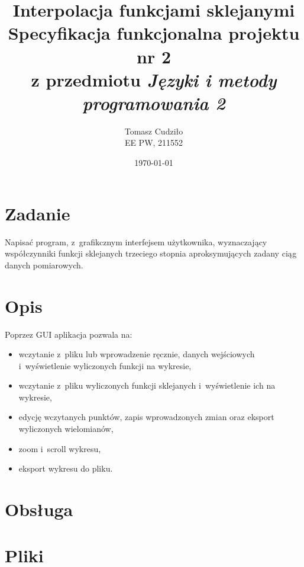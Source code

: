 \documentclass[10pt,a4paper]{article}
\begin{document}
\title{ 
  Interpolacja funkcjami sklejanymi\\
  {\normalsize Specyfikacja funkcjonalna projektu nr 2}\\\vspace{-12pt}
  {\normalsize z przedmiotu \emph{Języki i metody programowania 2}}
}
\author{
  Tomasz Cudziło\\
  {\small EE PW, 211552}
}
\date{\today}
\maketitle

\section*{Zadanie}
\label{sec:zadanie}

Napisać program, z~grafikcznym interfejsem użytkownika, wyznaczający
współczynniki funkcji sklejanych trzeciego stopnia aproksymujących zadany ciąg
danych pomiarowych.

\vspace{24pt}

\section{Opis}
\label{sec:opis}

Poprzez GUI aplikacja pozwala na:
\begin{itemize}
  \item wczytanie z~pliku lub wprowadzenie ręcznie, danych wejściowych
    i~wyświetlenie wyliczonych funkcji na wykresie,
  \item wczytanie z~pliku wyliczonych funkcji sklejanych i~wyświetlenie ich na
    wykresie,
  \item edycję wczytanych punktów, zapis wprowadzonych zmian oraz eksport
    wyliczonych wielomianów,
  \item zoom i~scroll wykresu,
  \item eksport wykresu do pliku.
\end{itemize}

\section{Obsługa}
\label{sec:obsluga}

\section{Pliki}
\label{sec:pliki}
\end{document}
